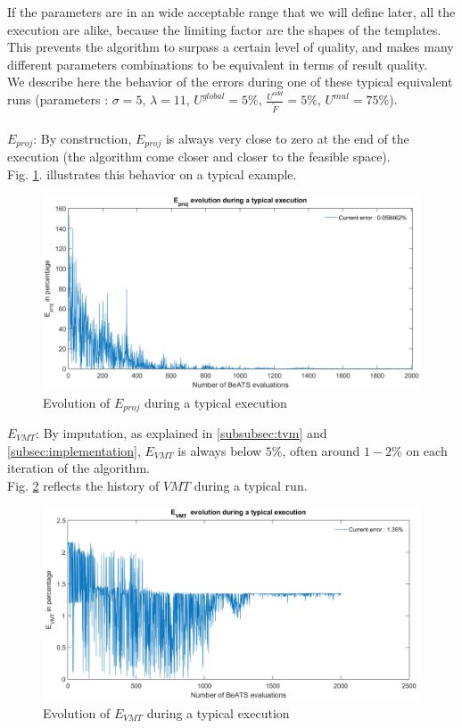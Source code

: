 If the parameters are in an wide acceptable range that we will define later, all the execution are alike, because the limiting factor are the shapes of the templates. This prevents the algorithm to surpass a certain level of quality, and makes many different parameters combinations to be equivalent in terms of result quality.\\
We describe here the behavior of the errors during one of these typical equivalent runs (parameters : $\sigma=5$, $\lambda=11$, $U^{global}=5\% $, $\frac{U^{add}}{\widetilde{F}}=5\% $, $U^{mul}=75 \% $).\\
\\
\emph{$E_{proj}$}: By construction, $E_{proj}$ is always very close to zero at the end of the execution (the algorithm come closer and closer to the feasible space).\\
Fig. \ref{fig:eprojexample}. illustrates this behavior on a typical example.\\ 
\begin{figure}[!h]
	\caption{Evolution of $E_{proj}$ during a typical execution}
	\label{fig:eprojexample}
	\includegraphics[width=7in]{figures/results_figures/eprojexample.png}
\end{figure}	
\newpage 
\emph{$E_{VMT}$}: By imputation, as explained in \ref{subsubsec:tvm} and \ref{subsec:implementation}, $E_{VMT}$ is always below $5\%$, often around $1-2\%$ on each iteration of the algorithm.\\
Fig. \ref{fig:vmtexample} reflects the history of $VMT$ during a typical run.\\
\begin{figure}[!h]
	\caption{Evolution of $E_{VMT}$ during a typical execution}
	\label{fig:vmtexample}
	\includegraphics[width=7in]{figures/results_figures/VMTexample.png}
\end{figure}	
